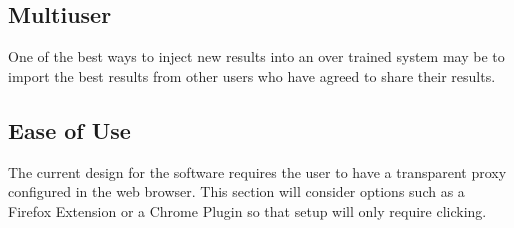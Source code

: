\documentclass[12pt]{article}
\begin{document}
\subsection{Multiuser}
One of the best ways to inject new results into an over trained system
may be to import the best results from other users who have agreed to
share their results.
\subsection{Ease of Use}
The current design for the software requires the user to have a
transparent proxy configured in the web browser.
This section will consider options such as a Firefox Extension or a
Chrome Plugin so that setup will only require clicking.
\pagebreak{}
 

\end{document}

